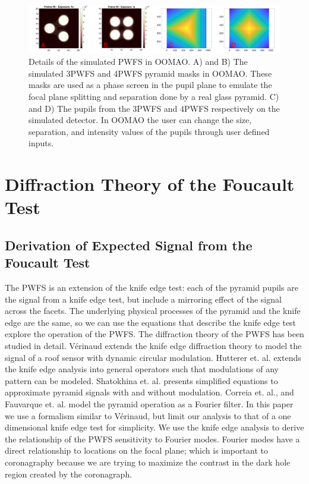 \begin{figure}
    \centering
    \includegraphics[width=1\textwidth]{Chapter Materials/Chapter Two Materials/oomaoFigs.png}
    \caption{Details of the simulated PWFS in OOMAO. A) and B) The simulated 3PWFS and 4PWFS pyramid masks in OOMAO. These masks are used as a phase screen in the pupil plane to emulate the focal plane splitting and separation done by a real glass pyramid. C) and D) The pupils from the 3PWFS and 4PWFS respectively on the simulated detector. In OOMAO the user can change the size, separation, and intensity values of the pupils through user defined inputs.}
    \label{fig:oomaoFigs}
\end{figure}


\section{Diffraction Theory of the Foucault Test}\label{diffraction}
\subsection{Derivation of Expected Signal from the Foucault Test}
  The PWFS is an extension of the knife edge test: each of the pyramid pupils are the signal from a knife edge test, but include a mirroring effect of the signal across the facets. The underlying physical processes of the pyramid and the knife edge are the same, so we can use the equations that describe the knife edge test explore the operation of the PWFS. The diffraction theory of the PWFS has been studied in detail. Vérinaud\cite{verinaud2004nature} extends the knife edge diffraction theory to model the signal of a roof sensor with dynamic circular modulation. Hutterer et. al.\cite{hutterer2019real} extends the knife edge analysis into general operators such that modulations of any pattern can be modeled. Shatokhina et. al.\cite{shatokhina2014fast} presents simplified equations to approximate pyramid signals with and without modulation. Correia et. al.\cite{correia2020performance}, and Fauvarque et. al.\cite{fauvarque2019kernel} model the pyramid operation as a Fourier filter. In this paper we use a formalism similar to Vérinaud, but limit our analysis to that of a one dimensional knife edge test for simplicity. We use the knife edge analysis to derive the relationship of the PWFS sensitivity to Fourier modes. Fourier modes have a direct relationship to locations on the focal plane; which is important to coronagraphy because we are trying to maximize the contrast in the dark hole region created by the coronagraph.
 
